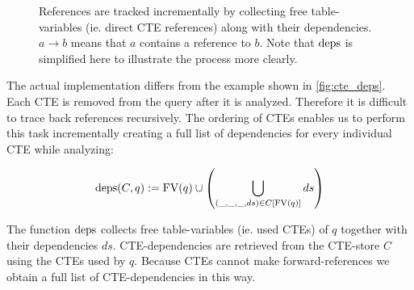 \begin{figure}[h!]
    \centering
    \caption{References are tracked incrementally by collecting free table-variables (ie. direct CTE references) along with their dependencies. $a \rightarrow b$ means that $a$ contains a reference to $b$. Note that $\operatorname{\text{deps}}$ is simplified here to illustrate the process more clearly.}
    \label{fig:cte_deps}
\end{figure}

The actual implementation differs from the example shown in \autoref{fig:cte_deps}. Each CTE is removed from the query after it is analyzed. Therefore it is difficult to trace back references recursively. The ordering of CTEs enables us to perform this task incrementally creating a full list of dependencies for every individual CTE while analyzing:

$$\operatorname{\text{deps}}(C, q) := \operatorname{\text{\rm FV}}(q) \cup \left(\bigcup_{(\_, \_, \_, ds) \in C[\operatorname{\text{\rm FV}}(q)]} ds \right)$$

The function $\operatorname{\text{deps}}$ collects free table-variables (ie. used CTEs) of $q$ together with their dependencies $ds$. CTE-dependencies are retrieved from the CTE-store $C$ using the CTEs used by $q$. Because CTEs cannot make forward-references we obtain a full list of CTE-dependencies in this way.


